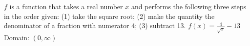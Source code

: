 {$f$ is a function that takes a real number $x$ and performs the following three steps in the order given: (1) take the square root; (2) make the quantity the denominator of a fraction with numerator 4; (3) subtract 13. 
}
{$f(x) = \frac{4}{\sqrt{x}} - 13$ \\ Domain: $(0, \infty)$}